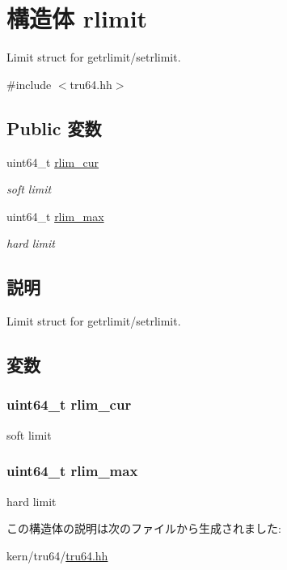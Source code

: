 \hypertarget{structTru64_1_1rlimit}{
\section{構造体 rlimit}
\label{structTru64_1_1rlimit}
}


Limit struct for getrlimit/setrlimit.  


{\ttfamily \#include $<$tru64.hh$>$}\subsection*{Public 変数}
\begin{DoxyCompactItemize}
\item 
uint64\_\-t \hyperlink{structTru64_1_1rlimit_af39897d07737cb27ef9484ae73c05fa4}{rlim\_\-cur}
\begin{DoxyCompactList}\small\item\em soft limit \item\end{DoxyCompactList}\item 
uint64\_\-t \hyperlink{structTru64_1_1rlimit_af8e4fdfd658610e9b762fb606dce339a}{rlim\_\-max}
\begin{DoxyCompactList}\small\item\em hard limit \item\end{DoxyCompactList}\end{DoxyCompactItemize}


\subsection{説明}
Limit struct for getrlimit/setrlimit. 

\subsection{変数}
\hypertarget{structTru64_1_1rlimit_af39897d07737cb27ef9484ae73c05fa4}{
\subsubsection[{rlim\_\-cur}]{\setlength{\rightskip}{0pt plus 5cm}uint64\_\-t {\bf rlim\_\-cur}}}
\label{structTru64_1_1rlimit_af39897d07737cb27ef9484ae73c05fa4}


soft limit \hypertarget{structTru64_1_1rlimit_af8e4fdfd658610e9b762fb606dce339a}{
\subsubsection[{rlim\_\-max}]{\setlength{\rightskip}{0pt plus 5cm}uint64\_\-t {\bf rlim\_\-max}}}
\label{structTru64_1_1rlimit_af8e4fdfd658610e9b762fb606dce339a}


hard limit 

この構造体の説明は次のファイルから生成されました:\begin{DoxyCompactItemize}
\item 
kern/tru64/\hyperlink{kern_2tru64_2tru64_8hh}{tru64.hh}\end{DoxyCompactItemize}
